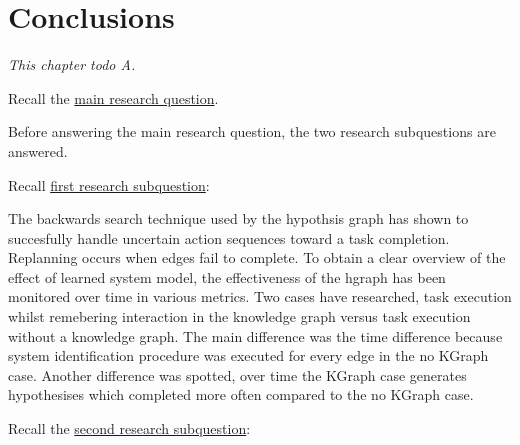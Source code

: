 \chapter{Conclusions}%
\label{chap:conclusion}
\textit{This chapter todo A.\bs}

Recall the \hyperref[researchquestion:main]{main research question}. \vspace{0.5\baselineskip}\\
\textit{\indent{}}\vspace{\baselineskip}

\noindent Before answering the main research question, the two research subquestions are answered.\vspace{\baselineskip}

\noindent Recall \hyperref[researchsubquestion:does_it_work]{first research subquestion}:\vspace{0.5\baselineskip}\\
\textit{\indent{}}\vspace{0.5\baselineskip}

\noindent The backwards search technique used by the hypothsis graph has shown to succesfully handle uncertain action sequences toward a task completion. Replanning occurs when edges fail to complete. To obtain a clear overview of the effect of learned system model, the effectiveness of the hgraph has been monitored over time in various metrics. Two cases have researched, task execution whilst remebering interaction in the knowledge graph versus task execution without a knowledge graph. The main difference was the time difference because system identification procedure was executed for every edge in the no KGraph case. Another difference was spotted, over time the KGraph case generates hypothesises which completed more often compared to the no KGraph case. \vspace{\baselineskip}


\noindent Recall the \hyperref[researchsubquestion:does_it_compare]{second research subquestion}:\vspace{0.5\baselineskip}\\
\textit{}\vspace{0.5\baselineskip}

